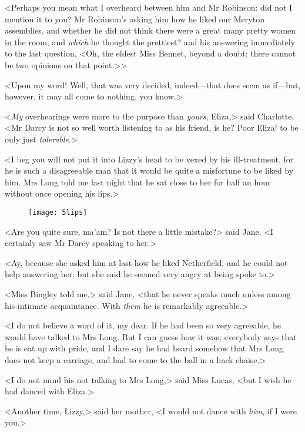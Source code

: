 <Perhaps you mean what I overheard between him and Mr Robinson: did not I mention it to you? Mr Robinson's asking him how he liked our Meryton assemblies, and whether he did not think there were a great many pretty women in the room, and \textit{which} he thought the prettiest? and his answering immediately to the last question, <Oh, the eldest Miss Bennet, beyond a doubt: there cannot be two opinions on that point.>>

<Upon my word! Well, that was very decided, indeed—that does seem as if—but, however, it may all come to nothing, you know.>

<\textit{My} overhearings were more to the purpose than \textit{yours}, Eliza,> said Charlotte. <Mr Darcy is not so well worth listening to as his friend, is he? Poor Eliza! to be only just \textit{tolerable}.>

<I beg you will not put it into Lizzy's head to be vexed by his ill-treatment, for he is such a disagreeable man that it would be quite a misfortune to be liked by him. Mrs Long told me last night that he sat close to her for half an hour without once opening his lips.>

\begin{figure}[tbh!]
\centering
\texttt{[image: 5lips]}
\end{figure}

<Are you quite sure, ma'am? Is not there a little mistake?> said Jane. <I certainly saw Mr Darcy speaking to her.>

<Ay, because she asked him at last how he liked Netherfield, and he could not help answering her; but she said he seemed very angry at being spoke to.>

<Miss Bingley told me,> said Jane, <that he never speaks much unless among his intimate acquaintance. With \textit{them} he is remarkably agreeable.>

<I do not believe a word of it, my dear. If he had been so very agreeable, he would have talked to Mrs Long. But I can guess how it was; everybody says that he is eat up with pride, and I dare say he had heard somehow that Mrs Long does not keep a carriage, and had to come to the ball in a hack chaise.>

<I do not mind his not talking to Mrs Long,> said Miss Lucas, <but I wish he had danced with Eliza.>

<Another time, Lizzy,> said her mother, <I would not dance with \textit{him}, if I were you.>

